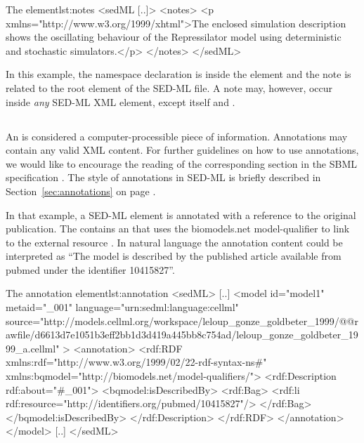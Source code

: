 
\begin{myXmlLst}{The  element}{lst:notes}
<sedML [..]>
	<notes>
  		<p xmlns="http://www.w3.org/1999/xhtml">The enclosed simulation description shows the oscillating behaviour of the Repressilator model using deterministic and stochastic simulators.</p>
	</notes>
</sedML>
\end{myXmlLst}

In this example, the namespace declaration is inside the  element and the note is related to the  root element of the SED-ML file. A note may, however, occur inside \emph{any} SED-ML XML element, except  itself and \hyperref[class:annotation]{}.


\subsection{}
\label{class:annotation}

An  is considered a computer-processible piece of information. Annotations may contain any valid XML content. For further guidelines on how to use annotations, we would like to encourage the reading of the corresponding section in the SBML specification \citep[pp. 14-16]{HBH+10}. The style of annotations in SED-ML is briefly described in Section~\ref{sec:annotations} on page \pageref{sec:annotations}.

 In that example, a SED-ML \hyperref[class:model]{} element is annotated with a reference to the original publication. The  contains an  that uses the biomodels.net model-qualifier  to link to the external resource . In natural language the annotation content could be interpreted as ``The model is described by the published article available from pubmed under the identifier 10415827''.

\begin{myXmlLst}{The annotation element}{lst:annotation}
<sedML>
	[..]
	<model id="model1" metaid="_001" language="urn:sedml:language:cellml" source="http://models.cellml.org/workspace/leloup_gonze_goldbeter_1999/@@rawfile/d6613d7e1051b3eff2bb1d3d419a445bb8c754ad/leloup_gonze_goldbeter_1999_a.cellml" >
		<annotation>
    		<rdf:RDF xmlns:rdf="http://www.w3.org/1999/02/22-rdf-syntax-ns#" xmlns:bqmodel="http://biomodels.net/model-qualifiers/">
				<rdf:Description rdf:about="#_001">
				<bqmodel:isDescribedBy>
				<rdf:Bag>
					<rdf:li rdf:resource="http://identifiers.org/pubmed/10415827"/>
				</rdf:Bag>
				</bqmodel:isDescribedBy>
    			</rdf:Description>
			</rdf:RDF>
		</annotation>
	</model>
	[..]
</sedML>
\end{myXmlLst}


